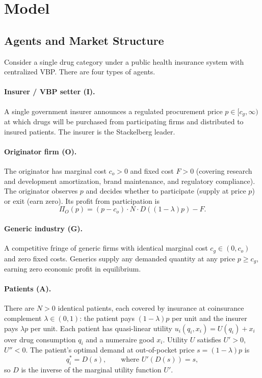 \documentclass[12pt]{article}
\theoremstyle{plain}
\theoremstyle{definition}
\theoremstyle{remark}
\newcommand{\1}{\mathbf{1}}
\begin{document}
\section{Model}
\label{sec:model}

\subsection{Agents and Market Structure}

Consider a single drug category under a public health insurance system with centralized VBP. There are four types of agents.

\paragraph{Insurer / VBP setter (I).} A single government insurer announces a regulated procurement price $p \in [c_g, \infty)$ at which drugs will be purchased from participating firms and distributed to insured patients. The insurer is the Stackelberg leader.

\paragraph{Originator firm (O).} The originator has marginal cost $c_o > 0$ and fixed cost $F > 0$ (covering research and development amortization, brand maintenance, and regulatory compliance). The originator observes $p$ and decides whether to participate (supply at price $p$) or exit (earn zero). Its profit from participation is
\begin{equation}
\Pi_O(p) = (p - c_o) \cdot N \cdot D\!\left((1-\lambda)p\right) - F.
\label{eq:origprof}
\end{equation}

\paragraph{Generic industry (G).} A competitive fringe of generic firms with identical marginal cost $c_g \in (0, c_o)$ and zero fixed costs. Generics supply any demanded quantity at any price $p \geq c_g$, earning zero economic profit in equilibrium.

\paragraph{Patients (A).} There are $N > 0$ identical patients, each covered by insurance at coinsurance complement $\lambda \in (0,1)$: the patient pays $(1-\lambda)p$ per unit and the insurer pays $\lambda p$ per unit. Each patient has quasi-linear utility $u_i(q_i, x_i) = U(q_i) + x_i$ over drug consumption $q_i$ and a numeraire good $x_i$. Utility $U$ satisfies $U' > 0$, $U'' < 0$. The patient's optimal demand at out-of-pocket price $s = (1-\lambda)p$ is
\begin{equation}
q_i^* = D(s), \qquad \text{where } U'(D(s)) = s,
\label{eq:demand}
\end{equation}
so $D$ is the inverse of the marginal utility function $U'$.
\end{document}
